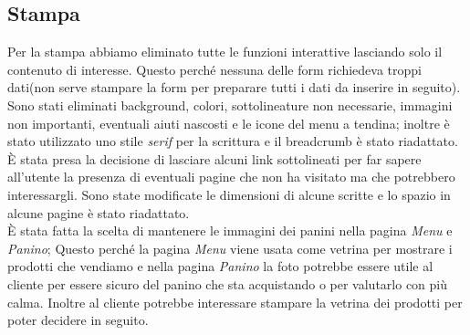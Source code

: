 \subsection{Stampa}
Per la stampa abbiamo eliminato tutte le funzioni interattive lasciando solo il contenuto di interesse.
Questo perché nessuna delle form richiedeva troppi dati(non serve stampare la form per preparare tutti i dati da inserire in seguito).\\
Sono stati eliminati background, colori, sottolineature non necessarie, immagini non importanti, eventuali aiuti nascosti e le icone del menu a tendina;
inoltre è stato utilizzato uno stile \emph{serif} per la scrittura e il breadcrumb è stato riadattato.\\
È stata presa la decisione di lasciare alcuni link sottolineati per far sapere all'utente la presenza di eventuali pagine che non ha visitato ma che potrebbero interessargli.
Sono state modificate le dimensioni di alcune scritte e lo spazio in alcune pagine è stato riadattato.\\
È stata fatta la scelta di mantenere le immagini dei panini nella pagina \emph{Menu} e \emph{Panino}; 
Questo perché la pagina \emph{Menu} viene usata come vetrina per mostrare i prodotti che vendiamo e nella pagina \emph{Panino} la foto potrebbe essere utile al cliente per essere sicuro del panino che sta acquistando o per valutarlo con più calma.
Inoltre al cliente potrebbe interessare stampare la vetrina dei prodotti per poter decidere in seguito.\\